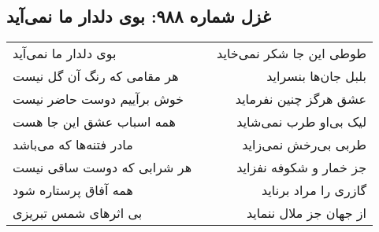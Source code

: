 \begin{center}
\section*{غزل شماره ۹۸۸: بوی دلدار ما نمی‌آید}
\label{sec:0988}
\begin{longtable}{l p{0.5cm} r}
بوی دلدار ما نمی‌آید
&&
طوطی این جا شکر نمی‌خاید
\\
هر مقامی که رنگ آن گل نیست
&&
بلبل جان‌ها بنسراید
\\
خوش برآییم دوست حاضر نیست
&&
عشق هرگز چنین نفرماید
\\
همه اسباب عشق این جا هست
&&
لیک بی‌او طرب نمی‌شاید
\\
مادر فتنه‌ها که می‌باشد
&&
طربی بی‌رخش نمی‌زاید
\\
هر شرابی که دوست ساقی نیست
&&
جز خمار و شکوفه نفزاید
\\
همه آفاق پرستاره شود
&&
گازری را مراد برناید
\\
بی اثرهای شمس تبریزی
&&
از جهان جز ملال ننماید
\\
\end{longtable}
\end{center}
